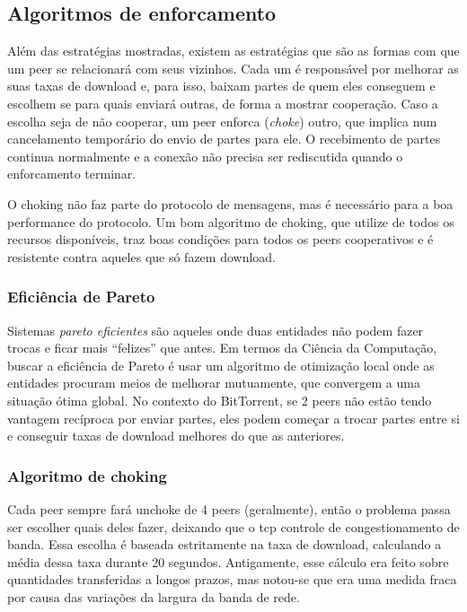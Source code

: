 
\newpage
\subsection*{Algoritmos de enforcamento}

Além das estratégias mostradas, existem as estratégias que são as formas com que um
\gls*{peer} se relacionará com seus vizinhos. Cada um é responsável por melhorar as
suas taxas de download e, para isso, baixam partes de quem eles conseguem e escolhem se
para quais enviará outras, de forma a mostrar cooperação. Caso a escolha seja de não
cooperar, um \gls*{peer} enforca (\emph{choke}) outro, que implica num cancelamento
temporário do envio de partes para ele. O recebimento de partes continua normalmente e a
conexão não precisa ser rediscutida quando o enforcamento terminar.

O choking não faz parte do protocolo de mensagens, mas é necessário para a boa
performance do protocolo. Um bom algoritmo de choking, que utilize de todos os recursos
disponíveis, traz boas condições para todos os \glspl*{peer} cooperativos e é resistente
contra aqueles que só fazem download.

\subsubsection*{Eficiência de Pareto}

Sistemas \emph{pareto eficientes} \cite{wiki:pareto} são aqueles onde duas entidades
não podem fazer trocas e ficar mais ``felizes'' que antes. Em termos da Ciência da
Computação, buscar a eficiência de Pareto é usar um algoritmo de otimização local onde
as entidades procuram meios de melhorar mutuamente, que convergem a uma situação ótima
global. No contexto do BitTorrent, se 2 \glspl*{peer} não estão tendo vantagem
recíproca por enviar partes, eles podem começar a trocar partes entre si e conseguir
taxas de download melhores do que as anteriores.

\subsubsection*{Algoritmo de choking}

Cada \gls*{peer} sempre fará unchoke de 4 \glspl*{peer} (geralmente), então o problema
passa ser escolher quais deles fazer, deixando que o \gls*{tcp} controle de
congestionamento de banda. Essa escolha é baseada estritamente na taxa de download,
calculando a média dessa taxa durante 20 segundos. Antigamente, esse cálculo era feito
sobre quantidades transferidas a longos prazos, mas notou-se que era uma medida fraca
por causa das variações da largura da banda de rede.

